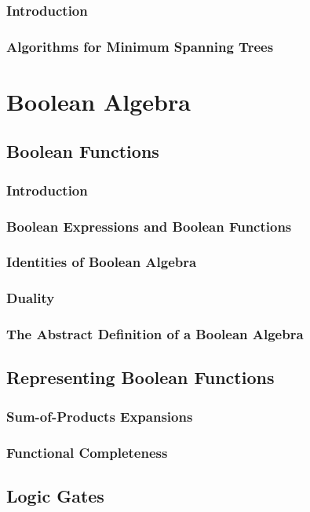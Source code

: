 \documentclass[11pt]{book}
\begin{document}
  \subsection{Introduction}
  \subsection{Algorithms for Minimum Spanning Trees}
 
\chapter{Boolean Algebra}
 \section{Boolean Functions}
  \subsection{Introduction}
  \subsection{Boolean Expressions and Boolean Functions}
  \subsection{Identities of Boolean Algebra}
  \subsection{Duality}
  \subsection{The Abstract Definition of a Boolean Algebra}
  
 \section{Representing Boolean Functions}
  \subsection{Sum-of-Products Expansions}
  \subsection{Functional Completeness}
  
 \section{Logic Gates}
\end{document}
